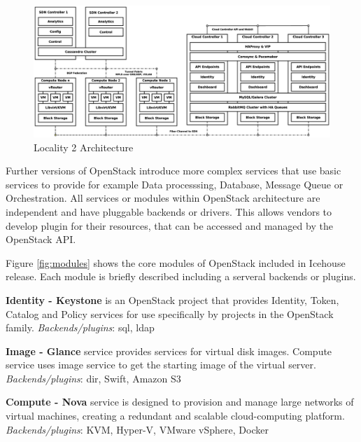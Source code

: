 \begin{figure}[!h]
\centering
\includegraphics[scale=.15]{img/use_case_ha_sdn.eps}
\caption{Locality 2 Architecture}
\label{fig:pisek}
\end{figure}


Further versions of OpenStack introduce more complex services that use basic services to provide for example Data processsing, Database, Message Queue  or Orchestration. All services or modules within OpenStack architecture are independent and have pluggable backends or drivers. This allows vendors to develop plugin for their resources, that can be accessed and managed by the OpenStack API.

Figure \ref{fig:modules} shows the core modules of OpenStack included in Icehouse release. Each module is briefly described including a serveral backends or plugins.





\textbf{Identity - Keystone} is an OpenStack project that provides Identity, Token, Catalog and Policy services for use specifically by projects in the OpenStack family. 
\textit{Backends/plugins}: sql, ldap

\textbf{Image - Glance} service provides services for virtual disk images. Compute service uses image service to get the starting image of the virtual server.
\textit{Backends/plugins}: dir, Swift, Amazon S3

\textbf{Compute - Nova} service is designed to provision and manage large networks of virtual machines, creating a redundant and scalable cloud-computing platform. 
\textit{Backends/plugins}: KVM, Hyper-V, VMware vSphere, Docker

